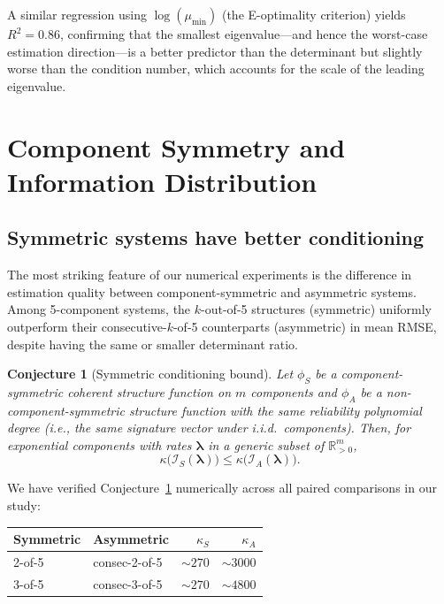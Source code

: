 \documentclass[12pt]{article}
\newtheorem{conjecture}[theorem]{Conjecture}
\theoremstyle{definition}
\theoremstyle{remark}
\newcommand{\Rset}{\mathbb{R}}
\newcommand{\blam}{\boldsymbol{\lambda}}
\begin{document}
A similar regression using $\log(\mu_{\min})$ (the E-optimality
criterion) yields $R^2 = 0.86$, confirming that the smallest
eigenvalue---and hence the worst-case estimation direction---is a
better predictor than the determinant but slightly worse than the
condition number, which accounts for the scale of the leading
eigenvalue.


\section{Component Symmetry and Information Distribution}
\label{sec:symmetry}

\subsection{Symmetric systems have better conditioning}
\label{sec:symmetric-conditioning}

The most striking feature of our numerical experiments is the
difference in estimation quality between component-symmetric and
asymmetric systems.  Among 5-component systems, the $k$-out-of-5
structures (symmetric) uniformly outperform their consecutive-$k$-of-5
counterparts (asymmetric) in mean RMSE, despite having the same or
smaller determinant ratio.

\begin{conjecture}[Symmetric conditioning bound]
\label{conj:symmetric}
Let $\phi_S$ be a component-symmetric coherent structure function on
$m$ components and $\phi_A$ be a non-component-symmetric structure
function with the same reliability polynomial degree (i.e., the same
signature vector under i.i.d.\ components).  Then, for exponential
components with rates $\blam$ in a generic subset of $\Rset_{>0}^m$,
\begin{equation}\label{eq:symmetric-bound}
  \kappa\bigl(\mathcal{I}_S(\blam)\bigr) \leq
  \kappa\bigl(\mathcal{I}_A(\blam)\bigr).
\end{equation}
\end{conjecture}

We have verified Conjecture~\ref{conj:symmetric} numerically across
all paired comparisons in our study:

\begin{center}
\begin{tabular}{llrr}
\toprule
Symmetric & Asymmetric & $\kappa_S$ & $\kappa_A$ \\
\midrule
2-of-5 & consec-2-of-5 & $\sim 270$ & $\sim 3000$ \\
3-of-5 & consec-3-of-5 & $\sim 270$ & $\sim 4800$ \\
\bottomrule
\end{tabular}
\end{center}
\end{document}

